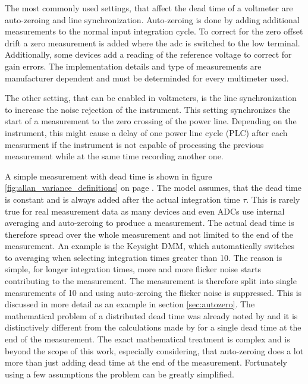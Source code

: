 The most commonly used settings, that affect the dead time of a voltmeter are auto-zeroing and line synchronization. Auto-zeroing is done by adding additional measurements to the normal input integration cycle. To correct for the zero offset drift a zero measurement is added where the adc is switched to the low terminal. Additionally, some devices add a reading of the reference voltage to correct for gain errors. The implementation details and type of measurements are manufacturer dependent and must be determinded for every multimeter used.

The other setting, that can be enabled in voltmeters, is the line synchronization to increase the noise rejection of the instrument. This setting synchronizes the start of a measurement to the zero crossing of the power line. Depending on the instrument, this might cause a delay of one power line cycle (PLC) after each measurment if the instrument is not capable of processing the previous measurement while at the same time recording another one.

A simple measurement with dead time is shown in figure \ref{fig:allan_variance_definitions} on page \pageref{fig:allan_variance_definitions}. The model assumes, that the dead time is constant and is always added after the actual integration time $\tau$. This is rarely true for real measurement data as many devices and even ADCs use internal averaging and auto-zeroing to produce a measurement. The actual dead time is therefore spread over the whole measurement and not limited to the end of the measurement. An example is the Keysight  DMM, which automatically switches to averaging when selecting integration times greater than \qty{10}{\plc}. The reason is simple, for longer integration times, more and more flicker noise starts contributing to the measurement. The measurement is therefore split into single measurements of \qty{10}{\plc} and using auto-zeroing the flicker noise is suppressed. This is discussed in more detail as an example in section \ref{sec:autozero}. The mathematical problem of a distributed dead time was already noted by \citeauthor{adev_noise_types} \cite{adev_noise_types} and it is distinctively different from the calculations made by \citeauthor{psd_to_adev} for a single dead time at the end of the measurement. The exact mathematical treatment is complex and is beyond the scope of this work, especially considering, that auto-zeroing does a lot more than just adding dead time at the end of the measurement. Fortunately using a few assumptions the problem can be greatly simplified.

